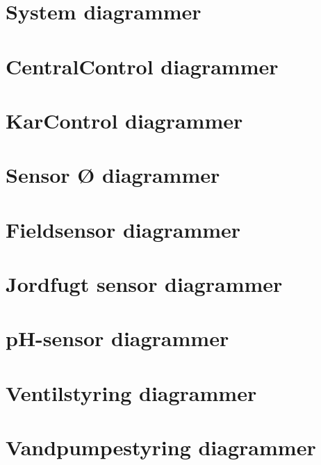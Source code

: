 \section{System diagrammer}



\newpage
\section{CentralControl diagrammer}


\newpage
\section{KarControl diagrammer}


\newpage
\section{Sensor Ø diagrammer}


\newpage
\section{Fieldsensor diagrammer}


\newpage
\section{Jordfugt sensor diagrammer}


\newpage
\section{pH-sensor diagrammer}


\newpage
\section{Ventilstyring diagrammer}


\newpage
\section{Vandpumpestyring diagrammer}


